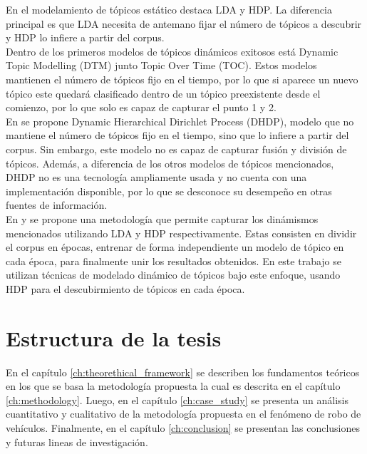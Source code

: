 En el modelamiento de tópicos estático destaca LDA y HDP. La diferencia principal es que LDA necesita de antemano fijar el número de tópicos a descubrir y HDP lo infiere a partir del corpus.\\

Dentro de los primeros modelos de tópicos dinámicos exitosos está Dynamic Topic Modelling (DTM) junto Topic Over Time (TOC)\citep{wang2006topics}. Estos modelos mantienen el número de tópicos fijo en el tiempo, por lo que si aparece un nuevo tópico este quedará clasificado dentro de un tópico preexistente desde el comienzo, por lo que solo es capaz de capturar el punto 1 y 2.\\

En \citep{ahmed2012timeline} se propone Dynamic Hierarchical Dirichlet Process (DHDP), modelo que no mantiene el número de tópicos fijo en el tiempo, sino que lo infiere a partir del corpus. Sin embargo, este modelo no es capaz de capturar fusión y división de tópicos. Además, a diferencia de los otros modelos de tópicos mencionados, DHDP no es una tecnología ampliamente usada y no cuenta con una implementación disponible, por lo que se desconoce su desempeño en otras fuentes de información.\\

En \citep{wilson2011tracking} y \citep{beykikhoshk2018discovering} se propone una metodología que permite capturar los dinámismos mencionados utilizando LDA y HDP respectivamente. Estas consisten en dividir el corpus en épocas, entrenar de forma independiente un modelo de tópico en cada época, para finalmente unir los resultados obtenidos. En este trabajo se utilizan técnicas de modelado dinámico de tópicos bajo este enfoque, usando HDP para el descubirmiento de tópicos en cada época.

\section{Estructura de la tesis}
En el capítulo \ref{ch:theorethical_framework} se describen los fundamentos teóricos en los que se basa la metodología propuesta la cual es descrita en el capítulo \ref{ch:methodology}. Luego, en el capítulo \ref{ch:case_study} se presenta un análisis cuantitativo y cualitativo de la metodología propuesta en el fenómeno de robo de vehículos. Finalmente, en el capítulo \ref{ch:conclusion} se presentan las conclusiones y futuras lineas de investigación.
